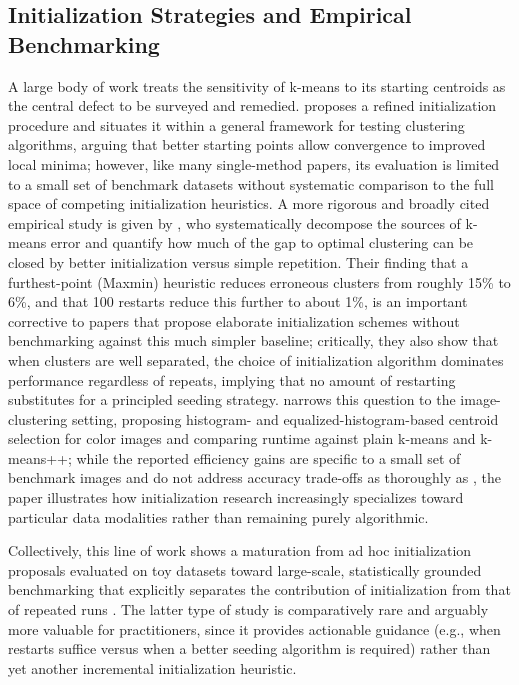 \subsection{Initialization Strategies and Empirical Benchmarking}
A large body of work treats the sensitivity of k-means to its starting centroids as the central defect to be surveyed and remedied. \cite{agha2012efficient} proposes a refined initialization procedure and situates it within a general framework for testing clustering algorithms, arguing that better starting points allow convergence to improved local minima; however, like many single-method papers, its evaluation is limited to a small set of benchmark datasets without systematic comparison to the full space of competing initialization heuristics. A more rigorous and broadly cited empirical study is given by \cite{franti2019how}, who systematically decompose the sources of k-means error and quantify how much of the gap to optimal clustering can be closed by better initialization versus simple repetition. Their finding that a furthest-point (Maxmin) heuristic reduces erroneous clusters from roughly 15\% to 6\%, and that 100 restarts reduce this further to about 1\%, is an important corrective to papers that propose elaborate initialization schemes without benchmarking against this much simpler baseline; critically, they also show that when clusters are well separated, the choice of initialization algorithm dominates performance regardless of repeats, implying that no amount of restarting substitutes for a principled seeding strategy. \cite{bhavani2022efficient} narrows this question to the image-clustering setting, proposing histogram- and equalized-histogram-based centroid selection for color images and comparing runtime against plain k-means and k-means++; while the reported efficiency gains are specific to a small set of benchmark images and do not address accuracy trade-offs as thoroughly as \cite{franti2019how}, the paper illustrates how initialization research increasingly specializes toward particular data modalities rather than remaining purely algorithmic.

Collectively, this line of work shows a maturation from ad hoc initialization proposals evaluated on toy datasets \cite{agha2012efficient,bhavani2022efficient} toward large-scale, statistically grounded benchmarking that explicitly separates the contribution of initialization from that of repeated runs \cite{franti2019how}. The latter type of study is comparatively rare and arguably more valuable for practitioners, since it provides actionable guidance (e.g., when restarts suffice versus when a better seeding algorithm is required) rather than yet another incremental initialization heuristic.

